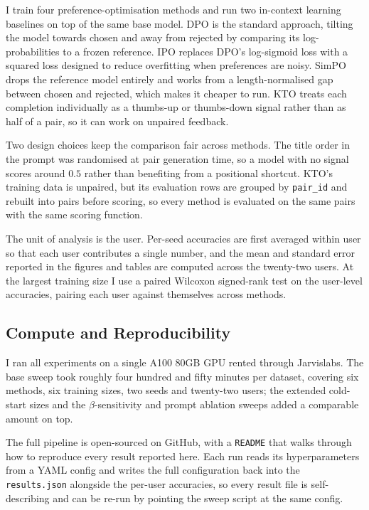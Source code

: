 I train four preference-optimisation methods and run two in-context learning baselines on top of the same base model. DPO is the standard approach, tilting the model towards chosen and away from rejected by comparing its log-probabilities to a frozen reference. IPO replaces DPO's log-sigmoid loss with a squared loss designed to reduce overfitting when preferences are noisy. SimPO drops the reference model entirely and works from a length-normalised gap between chosen and rejected, which makes it cheaper to run. KTO treats each completion individually as a thumbs-up or thumbs-down signal rather than as half of a pair, so it can work on unpaired feedback.

Two design choices keep the comparison fair across methods. The title order in the prompt was randomised at pair generation time, so a model with no signal scores around $0.5$ rather than benefiting from a positional shortcut. KTO's training data is unpaired, but its evaluation rows are grouped by \texttt{pair\_id} and rebuilt into pairs before scoring, so every method is evaluated on the same pairs with the same scoring function.

The unit of analysis is the user. Per-seed accuracies are first averaged within user so that each user contributes a single number, and the mean and standard error reported in the figures and tables are computed across the twenty-two users. At the largest training size I use a paired Wilcoxon signed-rank test on the user-level accuracies, pairing each user against themselves across methods.

\subsection{Compute and Reproducibility}
\label{sec:compute}

I ran all experiments on a single A100 80GB GPU rented through Jarvislabs. The base sweep took roughly four hundred and fifty minutes per dataset, covering six methods, six training sizes, two seeds and twenty-two users; the extended cold-start sizes and the $\beta$-sensitivity and prompt ablation sweeps added a comparable amount on top.

The full pipeline is open-sourced on GitHub, with a \texttt{README} that walks through how to reproduce every result reported here. Each run reads its hyperparameters from a YAML config and writes the full configuration back into the \texttt{results.json} alongside the per-user accuracies, so every result file is self-describing and can be re-run by pointing the sweep script at the same config.